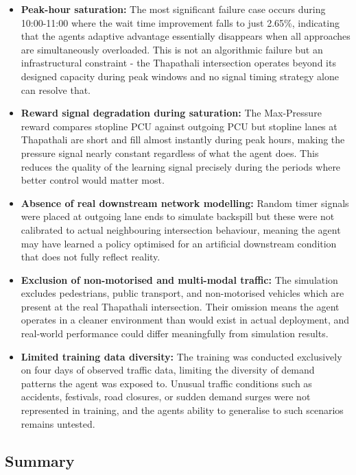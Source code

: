 \begin{itemize}
\item
  \textbf{Peak-hour saturation:} The most significant failure case
  occurs during 10:00-11:00 where the wait time improvement falls to
  just 2.65\%, indicating that the agent\textquotesingle s adaptive
  advantage essentially disappears when all approaches are
  simultaneously overloaded. This is not an algorithmic failure but an
  infrastructural constraint - the Thapathali intersection operates
  beyond its designed capacity during peak windows and no signal timing
  strategy alone can resolve that.
\item
  \textbf{Reward signal degradation during saturation:} The Max-Pressure
  reward compares stopline PCU against outgoing PCU but stopline lanes
  at Thapathali are short and fill almost instantly during peak hours,
  making the pressure signal nearly constant regardless of what the
  agent does. This reduces the quality of the learning signal precisely
  during the periods where better control would matter most.
\item
  \textbf{Absence of real downstream network modelling:} Random timer
  signals were placed at outgoing lane ends to simulate backspill but
  these were not calibrated to actual neighbouring intersection
  behaviour, meaning the agent may have learned a policy optimised for
  an artificial downstream condition that does not fully reflect
  reality.
\item
  \textbf{Exclusion of non-motorised and multi-modal traffic:} The
  simulation excludes pedestrians, public transport, and non-motorised
  vehicles which are present at the real Thapathali intersection. Their
  omission means the agent operates in a cleaner environment than would
  exist in actual deployment, and real-world performance could differ
  meaningfully from simulation results.
\item
  \textbf{Limited training data diversity:} The training was conducted
  exclusively on four days of observed traffic data, limiting the
  diversity of demand patterns the agent was exposed to. Unusual traffic
  conditions such as accidents, festivals, road closures, or sudden
  demand surges were not represented in training, and the
  agent\textquotesingle s ability to generalise to such scenarios
  remains untested.
\end{itemize}

\subsection{Summary}
\label{subsec:summary}

